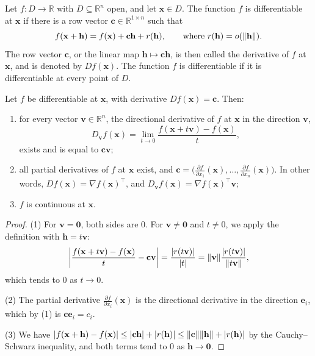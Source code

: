 \begin{definition}\label{L3-def:differentiable}
    Let $f: D \to \mathbb{R}$ with $D \subseteq \mathbb{R}^n$ open, and let $\mathbf{x} \in D$. The function $f$ is differentiable at $\mathbf{x}$ if there is a row vector $\mathbf{c} \in \mathbb{R}^{1 \times n}$ such that
    \[f(\mathbf{x} + \mathbf{h}) = f(\mathbf{x}) + \mathbf{c}\mathbf{h} + r(\mathbf{h}), \qquad \text{where } r(\mathbf{h}) = o(\lVert \mathbf{h} \rVert).\]
    The row vector $\mathbf{c}$, or the linear map $\mathbf{h} \mapsto \mathbf{c}\mathbf{h}$, is then called the derivative of $f$ at $\mathbf{x}$, and is denoted by $Df(\mathbf{x})$. The function $f$ is differentiable if it is differentiable at every point of $D$.
\end{definition}

\begin{proposition}\label{L3-prop:differentiable}
    Let $f$ be differentiable at $\mathbf{x}$, with derivative $Df(\mathbf{x}) = \mathbf{c}$. Then:
    \begin{enumerate}
        \item for every vector $\mathbf{v} \in \mathbb{R}^n$, the directional derivative of $f$ at $\mathbf{x}$ in the direction $\mathbf{v}$,
        \[D_{\mathbf{v}} f(\mathbf{x}) = \lim_{t \to 0} \frac{f(\mathbf{x} + t\mathbf{v}) - f(\mathbf{x})}{t},\]
        exists and is equal to $\mathbf{c}\mathbf{v}$;
        \item all partial derivatives of $f$ at $\mathbf{x}$ exist, and $\mathbf{c} = \big(\frac{\partial f}{\partial x_1}(\mathbf{x}), \ldots, \frac{\partial f}{\partial x_n}(\mathbf{x})\big)$. In other words, $Df(\mathbf{x}) = \nabla f(\mathbf{x})^\top$, and $D_{\mathbf{v}} f(\mathbf{x}) = \nabla f(\mathbf{x})^\top \mathbf{v}$;
        \item $f$ is continuous at $\mathbf{x}$.
    \end{enumerate}
\end{proposition}

\begin{proof}
    (1) For $\mathbf{v} = \mathbf{0}$, both sides are $0$. For $\mathbf{v} \neq \mathbf{0}$ and $t \neq 0$, we apply the definition with $\mathbf{h} = t\mathbf{v}$:
    \[\left| \frac{f(\mathbf{x} + t\mathbf{v}) - f(\mathbf{x})}{t} - \mathbf{c}\mathbf{v} \right| = \frac{|r(t\mathbf{v})|}{|t|} = \lVert \mathbf{v} \rVert \frac{|r(t\mathbf{v})|}{\lVert t\mathbf{v} \rVert},\]
    which tends to $0$ as $t \to 0$.

    (2) The partial derivative $\frac{\partial f}{\partial x_i}(\mathbf{x})$ is the directional derivative in the direction $\mathbf{e}_i$, which by (1) is $\mathbf{c}\mathbf{e}_i = c_i$.

    (3) We have $|f(\mathbf{x} + \mathbf{h}) - f(\mathbf{x})| \leq |\mathbf{c}\mathbf{h}| + |r(\mathbf{h})| \leq \lVert \mathbf{c} \rVert \lVert \mathbf{h} \rVert + |r(\mathbf{h})|$ by the Cauchy--Schwarz inequality, and both terms tend to $0$ as $\mathbf{h} \to \mathbf{0}$.
\end{proof}


